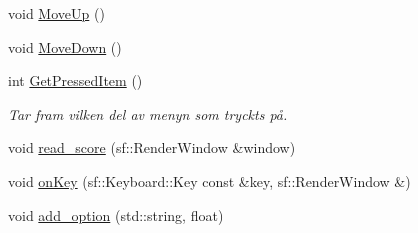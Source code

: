 \begin{DoxyCompactItemize}
void \hyperlink{classMenu_acfb038bbd1050d6c55c86eec1f35dbdb}{Move\+Up} ()
\item 
void \hyperlink{classMenu_a804da9a381bb6c633d5d2bc4f839ec62}{Move\+Down} ()
\item 
int \hyperlink{classMenu_a81b2029bf7783f38be26000969e99e30}{Get\+Pressed\+Item} ()
\begin{DoxyCompactList}\small\item\em Tar fram vilken del av menyn som tryckts på. \end{DoxyCompactList}\item 
void \hyperlink{classMenu_acd0c45fbf5c84d5de059c8b1b2d33bfa}{read\+\_\+score} (sf\+::\+Render\+Window \&window)
\item 
void \hyperlink{classMenu_a6cfb83fb8f947ab6e1b4c101a5326814}{on\+Key} (sf\+::\+Keyboard\+::\+Key const \&key, sf\+::\+Render\+Window \&)
\item 
void \hyperlink{classMenu_a5b2f54c794ca701d433caf755b83765e}{add\+\_\+option} (std\+::string, float)
\end{DoxyCompactItemize}
